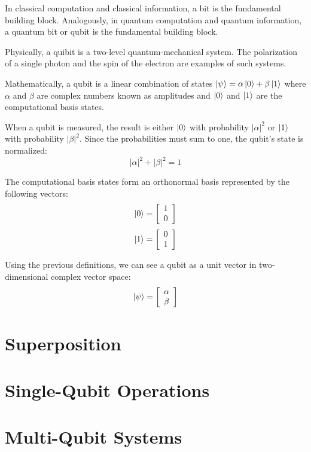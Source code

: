 In classical computation and classical information, a bit is the fundamental building block.
Analogously, in quantum computation and quantum information, a quantum bit or qubit is the fundamental building block.

Physically, a quibit is a two-level quantum-mechanical system. The polarization of a single photon and the spin of the electron are examples of such systems.

Mathematically, a qubit is a linear combination of states $\left|{\psi}\right\rangle=\alpha\left|{0}\right\rangle+\beta\left|{1}\right\rangle$ where $\alpha$ and $\beta$ are complex numbers known as amplitudes and $\left|{0}\right\rangle$ and $\left|{1}\right\rangle$ are the computational basis states.

When a qubit is measured, the result is either $\left|{0}\right\rangle$ with probability $|\alpha|^2$ or $\left|{1}\right\rangle$ with probability $|\beta|^2$.
Since the probabilities must sum to one, the qubit's state is normalized:
$$|\alpha|^2+|\beta|^2=1$$

The computational basis states form an orthonormal basis represented by the following vectors:
$$\left|{0}\right\rangle=\left[\begin{array}{c}1 \\ 0\end{array}\right]$$
$$\left|{1}\right\rangle=\left[\begin{array}{c}0 \\ 1\end{array}\right]$$

Using the previous definitions, we can see a qubit as a unit vector in two-dimensional complex vector space:
\[\left|{\psi}\right\rangle=\left[\begin{array}{c}\alpha \\ \beta\end{array}\right]\]

\section{Superposition}


\section{Single-Qubit Operations}


\section{Multi-Qubit Systems}

